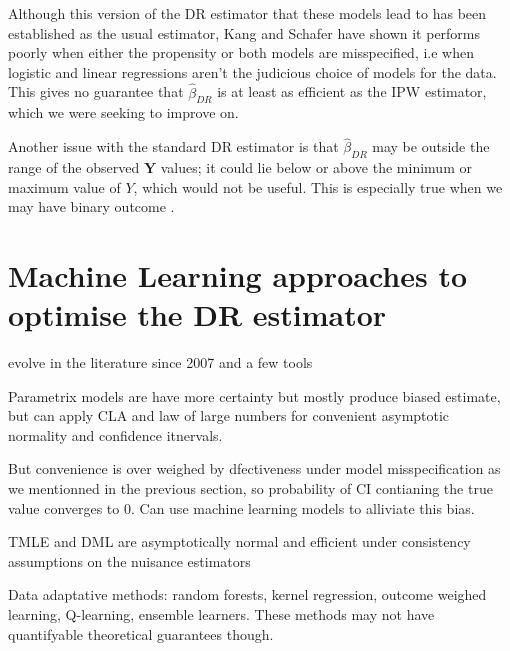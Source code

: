 \documentclass[12pt,twoside]{article}
\begin{document}
Although this version of the DR estimator that these models lead to has been established as the usual estimator, Kang and Schafer \cite{kang} have shown it performs poorly when either the propensity or both models are misspecified, i.e when logistic and linear regressions aren't the judicious choice of models for the data. This gives no guarantee that $\hat\beta_{DR}$ is at least as efficient as the IPW estimator, which we were seeking to improve on.

Another issue with the standard DR estimator is that $\hat\beta_{DR}$ may be outside the range of the observed $\mathbf{Y}$ values; it could lie below or above the minimum or maximum value of $Y$, which would not be useful. This is especially true when we may have binary outcome \cite{vansteelandt}.

\section{Machine Learning approaches to optimise the DR estimator}

evolve in the literature since 2007
and a few tools

\cite{diaz}

Parametrix models are have more certainty but mostly produce biased estimate, but can apply CLA and law of large numbers for convenient asymptotic normality and confidence itnervals.

But convenience is over weighed by dfectiveness under model misspecification as we mentionned in the previous section, so probability of CI contianing the true value converges to 0. Can use machine learning models to alliviate this bias.

TMLE and DML are asymptotically normal and efficient under consistency assumptions on the nuisance estimators

Data adaptative methods: random forests, kernel regression, outcome weighed learning, Q-learning, ensemble learners. These methods may not have quantifyable theoretical guarantees though.




\end{document}
